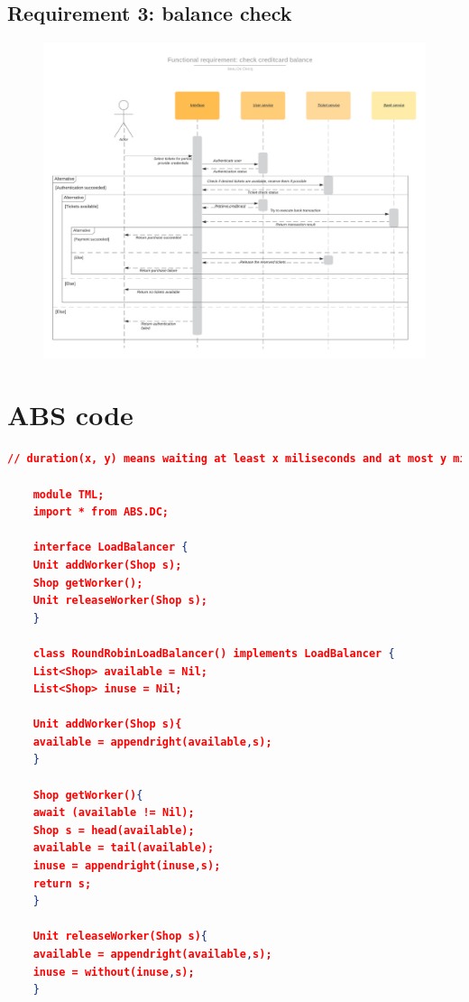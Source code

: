 \documentclass[conference]{IEEEtran}
\begin{document}
\begin{appendices}
	\subsection{Requirement 3: balance check}
		\begin{figure}[h]
			\includegraphics*[scale=0.7]{diagrams/FR3.png}
		\end{figure}
	\clearpage
	\newpage
	\section{ABS code}
	\label{appendix:abscode}
	\begin{lstlisting}[language=json]
	// duration(x, y) means waiting at least x miliseconds and at most y miliseconds
	
	module TML;
	import * from ABS.DC;
	
	interface LoadBalancer {
	Unit addWorker(Shop s);
	Shop getWorker();
	Unit releaseWorker(Shop s);
	}
	
	class RoundRobinLoadBalancer() implements LoadBalancer {
	List<Shop> available = Nil; 
	List<Shop> inuse = Nil;
	
	Unit addWorker(Shop s){
	available = appendright(available,s);
	}
	
	Shop getWorker(){
	await (available != Nil);
	Shop s = head(available); 
	available = tail(available); 
	inuse = appendright(inuse,s);
	return s;
	}
	
	Unit releaseWorker(Shop s){
	available = appendright(available,s); 
	inuse = without(inuse,s);
	}
	

\end{lstlisting}
\end{appendices}
\end{document}
